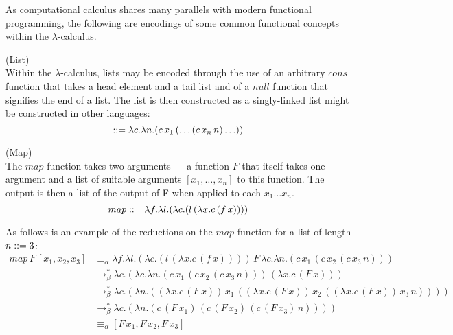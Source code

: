     As computational calculus shares many parallels with modern functional programming, the following are encodings of some common functional concepts within the $\lambda$-calculus.

    \begin{definition}{(List)\\}
        Within the $\lambda$-calculus, lists may be encoded through the use of an arbitrary ${cons}$ function that takes a head element and a tail list and of a ${null}$ function that signifies the end of a list.
        The list is then constructed as a singly-linked list might be constructed in other languages:
        \begin{equation}
            [x_1, \ldots, x_n] \defeq \lambda c . \lambda n . (c \, x_1 \, (\ldots (c \, x_n \, n) \ldots) )
        \end{equation}
    \end{definition}


    \begin{definition}{(Map)\\}
        The $map$ function takes two arguments --- a function $F$ that itself takes one argument and a list of suitable arguments $[x_1, \ldots, x_n]$ to this function.
        The output is then a list of the output of F when applied to each $x_1 \ldots x_n$.
        \begin{equation}
            {map} ::= \lambda f . \lambda l . (\lambda c . (l \, (\lambda x . c \, (f \, x))))
        \end{equation}
    \end{definition}


    \begin{example*}
        As follows is an example of the reductions on the ${map}$ function for a list of length $n ::= 3$:
        \begin{align*}
            {map} \, F \, [x_1, x_2, x_3]
                  & \equiv_{\alpha} \lambda f . \lambda l . (\lambda c . (l \, (\lambda x . c \, (f \, x)))) \, F \, \lambda c . \lambda n . (c \, x_1 \, (c \, x_2 \, (c \, x_3 \, n))) \\
                  & \rightarrow_\beta^* \lambda c . (\lambda c . \lambda n . (c \, x_1 \, (c \, x_2 \, (c \, x_3 \, n))) \, (\lambda x . c \, (F \, x))) \\
                  & \rightarrow_\beta^* \lambda c . (\lambda n . ((\lambda x . c \, (F \, x)) \, x_1 \, ((\lambda x . c \, (F \, x)) \, x_2 \, ((\lambda x . c \, (F \, x)) \, x_3 \, n)))) \\
                  & \rightarrow_\beta^* \lambda c . (\lambda n . (c \, (F \, x_1) \, (c \, (F \, x_2) \, (c \, (F \, x_3) \, n)))) \\
                  & \equiv_{\alpha} [F \, x_1, F \, x_2, F \, x_3]
        \end{align*}
    \end{example*}

